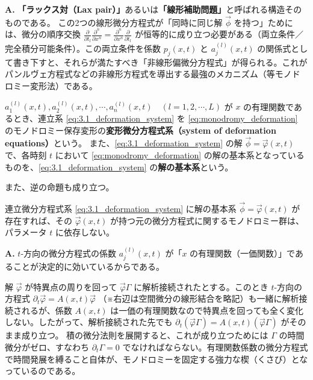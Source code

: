 \begin{Q}
\textbf{A.} \textbf{「ラックス対（Lax pair）」}あるいは\textbf{「線形補助問題」}と呼ばれる構造そのものである。
この2つの線形微分方程式が「同時に同じ解 $\vec{\phi}$ を持つ」ためには、微分の順序交換 $\frac{\partial}{\partial t_l} \frac{\partial^n}{\partial x^n} = \frac{\partial^n}{\partial x^n} \frac{\partial}{\partial t_l}$ が恒等的に成り立つ必要がある（両立条件／完全積分可能条件）。この両立条件を係数 $p_j(x,t)$ と $a_j^{(l)}(x,t)$ の関係式として書き下すと、それらが満たすべき「非線形偏微分方程式」が得られる。これがパンルヴェ方程式などの非線形方程式を導出する最強のメカニズム（等モノドロミー変形法）である。
\end{Q}

\begin{definition}[変形微分方程式系]
    $a_{1}^{(l)}(x,t), a_{2}^{(l)}(x,t), \cdots, a_{n}^{(l)}(x,t) \quad (l=1,2,\cdots,L)$ が $x$ の有理関数であるとき、連立系 \eqref{eq:3.1_deformation_system} を \eqref{eq:monodromy_deformation} のモノドロミー保存変形の\textbf{変形微分方程式系（system of deformation equations）}という。
    また、\eqref{eq:3.1_deformation_system} の解 $\vec{\phi}=\vec{\varphi}(x,t)$ で、各時刻 $t$ において \eqref{eq:monodromy_deformation} の解の基本系となっているものを、\eqref{eq:3.1_deformation_system} の\textbf{解の基本系}という。
\end{definition}

また、逆の命題も成り立つ。
\begin{proposition}\label{prop:3.1_fundamental_system_preserves_monodromy}
連立微分方程式系 \eqref{eq:3.1_deformation_system} に解の基本系 $\vec{\phi}=\vec{\varphi}(x,t)$ が存在すれば、その $\vec{\varphi}(x,t)$ が持つ元の微分方程式に関するモノドロミー群は、パラメータ $t$ に依存しない。
\end{proposition}

\begin{Q}
\textbf{A.} $t$-方向の微分方程式の係数 $a_j^{(l)}(x,t)$ が「$x$ の有理関数（一価関数）」であることが決定的に効いているからである。

解 $\vec{\varphi}$ が特異点の周りを回って $\vec{\varphi}\Gamma$ に解析接続されたとする。このとき $t$-方向の方程式 $\partial_t \vec{\varphi} = A(x,t)\vec{\varphi}$ （※右辺は空間微分の線形結合を略記）も一緒に解析接続されるが、係数 $A(x,t)$ は一価の有理関数なので特異点を回っても全く変化しない。したがって、解析接続された先でも $\partial_t (\vec{\varphi}\Gamma) = A(x,t)(\vec{\varphi}\Gamma)$ がそのまま成り立つ。
積の微分法則を展開すると、これが成り立つためには $\Gamma$ の時間微分がゼロ、すなわち $\partial_t \Gamma = 0$ でなければならない。有理関数係数の微分方程式で時間発展を縛ること自体が、モノドロミーを固定する強力な楔（くさび）となっているのである。
\end{Q}

